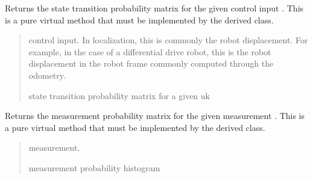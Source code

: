 \documentclass[letterpaper,10pt,english]{sphinxmanual}
\begin{document}
\begin{fulllineitems}
\begin{fulllineitems}
\label{\detokenize{HF:HF.HF.StateTransitionProbability_4_uk}}
\pysigstartsignatures
{}
\pysigstopsignatures
\sphinxAtStartPar
Returns the state transition probability matrix for the given control input .
This is a pure virtual method that must be implemented by the derived class.
\begin{quote}\begin{description}
\sphinxAtStartPar
{} \textendash{} control input. In localization, this is commonly the robot displacement. For example, in the case of a differential drive robot, this is the robot displacement in the robot frame commonly computed through the odometry.

\sphinxAtStartPar
{} state transition probability matrix for a given uk

\end{description}\end{quote}

\end{fulllineitems}


\begin{fulllineitems}
\label{\detokenize{HF:HF.HF.MeasurementProbability}}
\pysigstartsignatures
{}
\pysigstopsignatures
\sphinxAtStartPar
Returns the measurement probability matrix for the given measurement .
This is a pure virtual method that must be implemented by the derived class.
\begin{quote}\begin{description}
\sphinxAtStartPar
{} \textendash{} measurement.

\sphinxAtStartPar
{} measurement probability histogram

\end{description}\end{quote}

\end{fulllineitems}


\end{fulllineitems}
\end{document}
